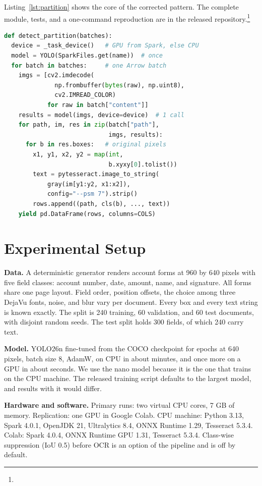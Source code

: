 Listing~\ref{lst:partition} shows the core of the corrected pattern. The complete module, tests, and a one-command reproduction are in the released repository.\footnote{\repourl}

\begin{lstlisting}[language=Python,caption={Partition-level detection and OCR (abridged from \texttt{findoc/pipeline.py}).},label={lst:partition}]
def detect_partition(batches):
  device = _task_device()   # GPU from Spark, else CPU
  model = YOLO(SparkFiles.get(name))  # once
  for batch in batches:     # one Arrow batch
    imgs = [cv2.imdecode(
              np.frombuffer(bytes(raw), np.uint8),
              cv2.IMREAD_COLOR)
            for raw in batch["content"]]
    results = model(imgs, device=device)  # 1 call
    for path, im, res in zip(batch["path"],
                             imgs, results):
      for b in res.boxes:   # original pixels
        x1, y1, x2, y2 = map(int,
                             b.xyxy[0].tolist())
        text = pytesseract.image_to_string(
            gray(im[y1:y2, x1:x2]),
            config="--psm 7").strip()
        rows.append((path, cls(b), ..., text))
    yield pd.DataFrame(rows, columns=COLS)
\end{lstlisting}

\section{Experimental Setup}\label{sec:setup}
\textbf{Data.} A deterministic generator renders account forms at 960 by 640 pixels with five field classes: account number, date, amount, name, and signature. All forms share one page layout. Field order, position offsets, the choice among three DejaVu fonts, noise, and blur vary per document. Every box and every text string is known exactly. The split is 240 training, 60 validation, and 60 test documents, with disjoint random seeds. The test split holds 300 fields, of which 240 carry text.

\textbf{Model.} YOLO26n fine-tuned from the COCO checkpoint for \valTrainEpochs{} epochs at 640 pixels, batch size 8, AdamW, on CPU in about \valTrainMinutes{} minutes, and once more on a GPU in about \valGpuTrainSeconds{} seconds. We use the nano model because it is the one that trains on the CPU machine. The released training script defaults to the largest model, and results with it would differ.

\textbf{Hardware and software.} Primary runs: two virtual CPU cores, 7 GB of memory. Replication: one \valGpuName{} GPU in Google Colab. CPU machine: Python 3.13, Spark 4.0.1, OpenJDK 21, Ultralytics 8.4, ONNX Runtime 1.29, Tesseract 5.3.4. Colab: Spark 4.0.4, ONNX Runtime GPU 1.31, Tesseract 5.3.4. Class-wise suppression (IoU 0.5) before OCR is an option of the pipeline and is off by default.

